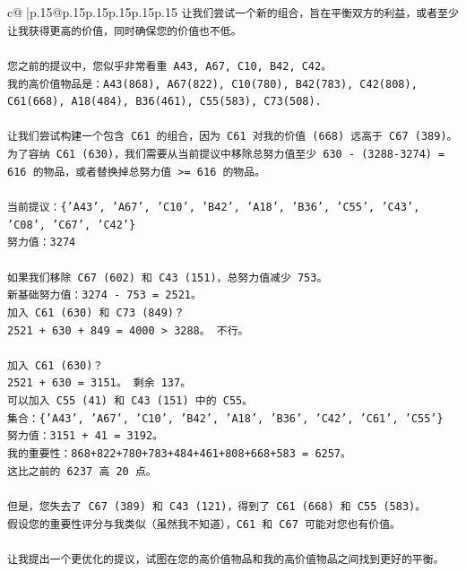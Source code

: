 \documentclass{article}
\begin{document}
{\begin{supertabular}{c@{$\;$}|p{.15\linewidth}@{}p{.15\linewidth}p{.15\linewidth}p{.15\linewidth}p{.15\linewidth}p{.15\linewidth}}
{{{\texttt{让我们尝试一个新的组合，旨在平衡双方的利益，或者至少让我获得更高的价值，同时确保您的价值也不低。} \\
\\ 
\texttt{您之前的提议中，您似乎非常看重 A43, A67, C10, B42, C42。} \\
\texttt{我的高价值物品是：A43(868), A67(822), C10(780), B42(783), C42(808), C61(668), A18(484), B36(461), C55(583), C73(508).} \\
\\ 
\texttt{让我们尝试构建一个包含 C61 的组合，因为 C61 对我的价值 (668) 远高于 C67 (389)。} \\
\texttt{为了容纳 C61 (630)，我们需要从当前提议中移除总努力值至少 630 {-} (3288{-}3274) = 616 的物品，或者替换掉总努力值 >= 616 的物品。} \\
\\ 
\texttt{当前提议：\{'A43', 'A67', 'C10', 'B42', 'A18', 'B36', 'C55', 'C43', 'C08', 'C67', 'C42'\}} \\
\texttt{努力值：3274} \\
\\ 
\texttt{如果我们移除 C67 (602) 和 C43 (151)，总努力值减少 753。} \\
\texttt{新基础努力值：3274 {-} 753 = 2521。} \\
\texttt{加入 C61 (630) 和 C73 (849)？} \\
\texttt{2521 + 630 + 849 = 4000 > 3288。 不行。} \\
\\ 
\texttt{加入 C61 (630)？} \\
\texttt{2521 + 630 = 3151。 剩余 137。} \\
\texttt{可以加入 C55 (41) 和 C43 (151) 中的 C55。} \\
\texttt{集合：\{'A43', 'A67', 'C10', 'B42', 'A18', 'B36', 'C42', 'C61', 'C55'\}} \\
\texttt{努力值：3151 + 41 = 3192。} \\
\texttt{我的重要性：868+822+780+783+484+461+808+668+583 = 6257。} \\
\texttt{这比之前的 6237 高 20 点。} \\
\\ 
\texttt{但是，您失去了 C67 (389) 和 C43 (121)，得到了 C61 (668) 和 C55 (583)。} \\
\texttt{假设您的重要性评分与我类似（虽然我不知道），C61 和 C67 可能对您也有价值。} \\
\\ 
\texttt{让我提出一个更优化的提议，试图在您的高价值物品和我的高价值物品之间找到更好的平衡。} \\
}}}
\end{supertabular}}
\end{document}
